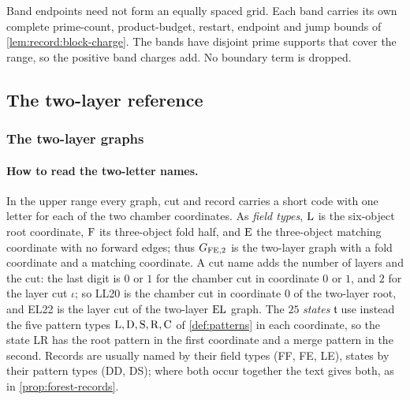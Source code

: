 \begin{remark}\label{rem:band-endpoints}
Band endpoints need not form an equally spaced grid. Each band carries its own
complete prime-count, product-budget, restart, endpoint and jump bounds of
\cref{lem:record:block-charge}. The bands have disjoint prime supports that cover
the range, so the positive band charges add. No boundary term is dropped.
\end{remark}

\subsection{The two-layer reference}\label{subsec:upper-two-layer}

\subsubsection{The two-layer graphs}\label{subsec:push:layer72spectral}

\paragraph{How to read the two-letter names.}
In the upper range every graph, cut and record carries a short
code with one letter for each of the two chamber coordinates. As
\emph{field types}, $\rm L$ is the six-object root coordinate,
$\rm F$ its three-object fold half, and $\rm E$ the three-object
matching coordinate with no forward edges; thus $G_{{\rm FE},2}$ is
the two-layer graph with a fold coordinate and a matching
coordinate. A cut name adds the number of layers and the cut: the
last digit is $0$ or $1$ for the chamber cut in coordinate $0$ or
$1$, and $2$ for the layer cut $\iota$; so LL20 is the chamber cut
in coordinate $0$ of the two-layer root, and EL22 is the layer cut
of the two-layer $\rm EL$ graph. The $25$ \emph{states}
$\mathfrak t$ use instead the five pattern types
$\rm L,D,S,R,C$ of \cref{def:patterns} in each coordinate, so the
state LR has the root pattern in the first coordinate and a merge
pattern in the second. Records are usually named by their field
types (FF, FE, LE), states by their pattern types (DD, DS); where
both occur together the text gives both, as in
\cref{prop:forest-records}.


